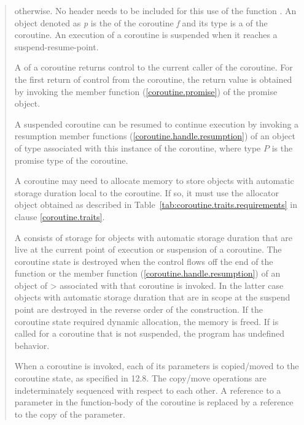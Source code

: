 \begin{quote}
otherwise. 
No header needs to be included for this use of the function .
An object denoted as \textit{p} is the  of
the coroutine \textit{f} and its type is a 
of the coroutine.
An execution of a coroutine is suspended when it reaches a suspend-resume-point.

\pnum 
A  of a coroutine returns control to the current
caller of the coroutine. For the first return of control from the coroutine, the return value is obtained by invoking the member function 
 (\ref{coroutine.promise})
of the promise object.


\pnum
A suspended coroutine can be resumed
to continue execution by invoking
a resumption member functions (\ref{coroutine.handle.resumption}) of an object of  type
associated with this instance of the coroutine, where type $P$
is the promise type of the coroutine. 

\pnum
A coroutine may need to allocate
memory to store objects with automatic storage duration
local to the coroutine. If so, it must
use the allocator object obtained as described in 
Table~\ref{tab:coroutine.traits.requirements} in clause \ref{coroutine.traits}.

\pnum
A  consists of 
storage for objects with automatic storage duration
that are live at the current point of execution or suspension of 
a coroutine.
The coroutine state is destroyed when
the control flows off the end of the function or
the  member function (\ref{coroutine.handle.resumption}) of an object of > associated with that coroutine is invoked. In the latter case objects with automatic storage duration that are in scope
at the suspend point are destroyed in the reverse order of the construction. If the coroutine state required dynamic allocation, the memory
is freed. If  is called for a coroutine that is not suspended, the program has undefined behavior.


\pnum
When a coroutine is invoked, each of its parameters is copied/moved to the coroutine state, as specified in 12.8.  The copy/move operations are indeterminately sequenced with respect to each other.
A reference to a parameter in the function-body of the coroutine is replaced by a reference to the copy of the parameter.


\end{quote}
